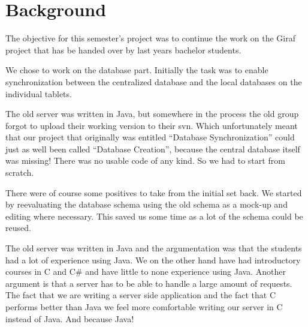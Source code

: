 \section{Background}
The objective for this semester's project was to continue the work on the Giraf project that has be handed over by last years bachelor students.

We chose to work on the database part. Initially the task was to enable synchronization between the centralized database and the local databases on the individual tablets.

The old server was written in Java, but somewhere in the process the old group forgot to upload their working version to their svn. Which unfortunately meant that our project that originally was entitled ``Database Synchronization'' could just as well been called ``Database Creation'', because the central database itself was missing! There was no usable code of any kind. So we had to start from scratch.

There were of course some positives to take from the initial set back. We started by reevaluating the database schema using the old schema as a mock-up and editing where necessary. This saved us some time as a lot of the schema could be reused.

The old server was written in Java and the argumentation was that the students had a lot of experience using Java.
We on the other hand have had introductory courses in C and C\# and have little to none experience using Java. Another argument is that a server has to be able to handle a large amount of requests. The fact that we are writing a server side application and the fact that C performs better than Java we feel more comfortable writing our server in C instead of Java. And because Java!
